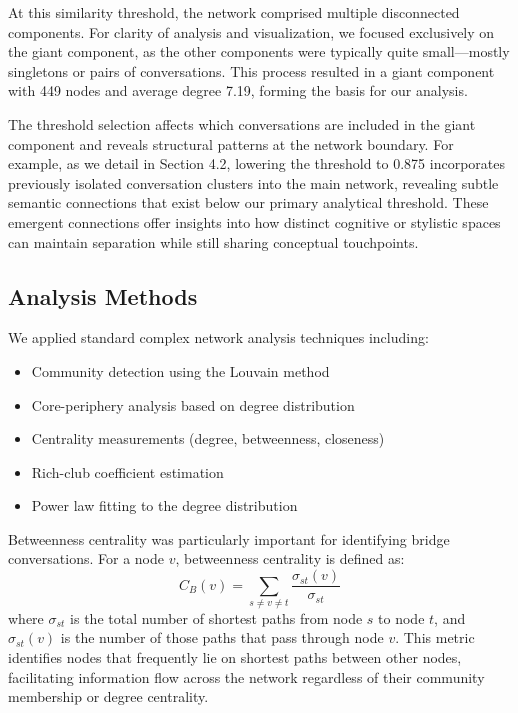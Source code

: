 \documentclass[10pt, a4paper]{article}
\begin{document}
At this similarity threshold, the network comprised multiple disconnected components. For clarity of analysis and visualization, we focused exclusively on the giant component, as the other components were typically quite small—mostly singletons or pairs of conversations. This process resulted in a giant component with 449 nodes and average degree 7.19, forming the basis for our analysis.

The threshold selection affects which conversations are included in the giant component and reveals structural patterns at the network boundary. For example, as we detail in Section 4.2, lowering the threshold to 0.875 incorporates previously isolated conversation clusters into the main network, revealing subtle semantic connections that exist below our primary analytical threshold. These emergent connections offer insights into how distinct cognitive or stylistic spaces can maintain separation while still sharing conceptual touchpoints.

\subsection{Analysis Methods}

We applied standard complex network analysis techniques including:
\begin{itemize}
    \item Community detection using the Louvain method
    \item Core-periphery analysis based on degree distribution
    \item Centrality measurements (degree, betweenness, closeness)
    \item Rich-club coefficient estimation
    \item Power law fitting to the degree distribution
\end{itemize}

Betweenness centrality was particularly important for identifying bridge conversations. For a node $v$, betweenness centrality is defined as:
\begin{equation}
C_B(v) = \sum_{s \neq v \neq t} \frac{\sigma_{st}(v)}{\sigma_{st}}
\end{equation}
where $\sigma_{st}$ is the total number of shortest paths from node $s$ to node $t$, and $\sigma_{st}(v)$ is the number of those paths that pass through node $v$. This metric identifies nodes that frequently lie on shortest paths between other nodes, facilitating information flow across the network regardless of their community membership or degree centrality.
\end{document}
